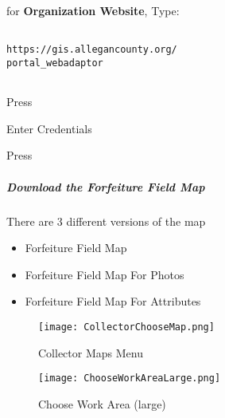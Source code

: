 \vspace{.25in}

for \textbf{Organization Website}, Type:
\vspace{.25in}

\begin{verbatim}

https://gis.allegancounty.org/
portal_webadaptor


\end{verbatim}

\vspace{.5in}

\noindent Press \Large {}
\vspace{2in}

\noindent Enter Credentials
\vspace{1in}

\noindent Press \Large {}

\clearpage
\subparagraph[Download the Forfeiture Field Map]{Download the Forfeiture Field Map \texorpdfstring{\\}{}}
\noindent There are 3 different versions of the map
\vspace{.05in}

\begin{itemize}
\item Forfeiture Field Map
\item Forfeiture Field Map For Photos
\item Forfeiture Field Map For Attributes
\end{itemize}

\begin{wrapfigure}{r}{0.5\textwidth}
\centering
    \texttt{[image: CollectorChooseMap.png]}
\caption{Collector Maps Menu}
\end{wrapfigure}

\vspace{.5in}

\vspace{1.25in}


\clearpage
\begin{wrapfigure}{r}{0.5\textwidth}
\centering
    \texttt{[image: ChooseWorkAreaLarge.png]}
\caption{Choose Work Area (large)}
\end{wrapfigure}

